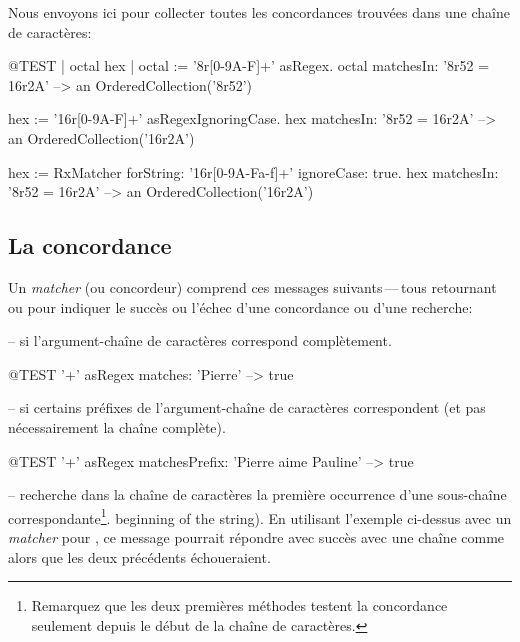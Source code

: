 \documentclass[a4paper,10pt,twoside]{book}
\begin{document}
{Nous envoyons ici  pour collecter toutes
les concordances trouvées dans une chaîne de caractères:

\begin{code}{@TEST | octal hex |}
octal := '8r[0-9A-F]+' asRegex.
octal matchesIn: '8r52 = 16r2A' --> an OrderedCollection('8r52')

hex := '16r[0-9A-F]+' asRegexIgnoringCase.
hex matchesIn: '8r52 = 16r2A'   --> an OrderedCollection('16r2A')

hex := RxMatcher forString: '16r[0-9A-Fa-f]+' ignoreCase: true.
hex matchesIn: '8r52 = 16r2A'   --> an OrderedCollection('16r2A')
\end{code}

\subsection{La concordance}

Un \emph{matcher} (ou concordeur) comprend ces messages suivants\,---\,tous
retournant  ou  pour indiquer le succès ou l'échec
d'une concordance ou d'une recherche:

  --  si l'argument-chaîne de
caractères  correspond complètement.

\begin{code}{@TEST}
'\w+' asRegex matches: 'Pierre' --> true
\end{code}

  --  si certains préfixes
de l'argument-chaîne de caractères  correspondent (et pas
nécessairement la chaîne complète).

\begin{code}{@TEST}
'\w+' asRegex matchesPrefix: 'Pierre aime Pauline' --> true
\end{code}

  -- recherche dans la chaîne de
caractères la première occurrence d'une sous-chaîne
correspondante\footnote{Remarquez que les deux premières méthodes
  testent la concordance seulement depuis le début de la chaîne de caractères.}.
beginning of the string).
En utilisant l'exemple ci-dessus avec un \emph{matcher} pour ,
ce message pourrait répondre avec succès avec une chaîne comme
 alors que les deux précédents échoueraient. %

}
\end{document}

